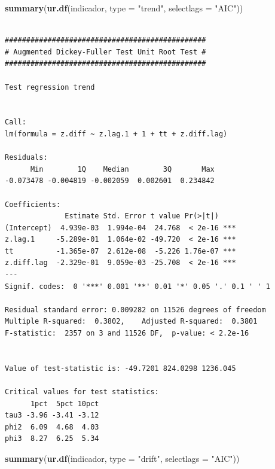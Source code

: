 \documentclass[
  12pt]{article}
\newenvironment{Shaded}{\begin{snugshade}}{\end{snugshade}}
\newcommand{\AttributeTok}[1]{\textcolor[rgb]{0.13,0.29,0.53}{#1}}
\newcommand{\FunctionTok}[1]{\textcolor[rgb]{0.13,0.29,0.53}{\textbf{#1}}}
\newcommand{\NormalTok}[1]{#1}
\newcommand{\StringTok}[1]{\textcolor[rgb]{0.31,0.60,0.02}{#1}}
\begin{document}
\newpage

\begin{Shaded}
\begin{Highlighting}[]
\FunctionTok{summary}\NormalTok{(}\FunctionTok{ur.df}\NormalTok{(indicador, }\AttributeTok{type =}  \StringTok{"trend"}\NormalTok{, }
              \AttributeTok{selectlags =} \StringTok{"AIC"}\NormalTok{))}
\end{Highlighting}
\end{Shaded}

\begin{verbatim}

############################################### 
# Augmented Dickey-Fuller Test Unit Root Test # 
############################################### 

Test regression trend 


Call:
lm(formula = z.diff ~ z.lag.1 + 1 + tt + z.diff.lag)

Residuals:
      Min        1Q    Median        3Q       Max 
-0.073478 -0.004819 -0.002059  0.002601  0.234842 

Coefficients:
              Estimate Std. Error t value Pr(>|t|)    
(Intercept)  4.939e-03  1.994e-04  24.768  < 2e-16 ***
z.lag.1     -5.289e-01  1.064e-02 -49.720  < 2e-16 ***
tt          -1.365e-07  2.612e-08  -5.226 1.76e-07 ***
z.diff.lag  -2.329e-01  9.059e-03 -25.708  < 2e-16 ***
---
Signif. codes:  0 '***' 0.001 '**' 0.01 '*' 0.05 '.' 0.1 ' ' 1

Residual standard error: 0.009282 on 11526 degrees of freedom
Multiple R-squared:  0.3802,    Adjusted R-squared:  0.3801 
F-statistic:  2357 on 3 and 11526 DF,  p-value: < 2.2e-16


Value of test-statistic is: -49.7201 824.0298 1236.045 

Critical values for test statistics: 
      1pct  5pct 10pct
tau3 -3.96 -3.41 -3.12
phi2  6.09  4.68  4.03
phi3  8.27  6.25  5.34
\end{verbatim}

\begin{Shaded}
\begin{Highlighting}[]
\FunctionTok{summary}\NormalTok{(}\FunctionTok{ur.df}\NormalTok{(indicador, }\AttributeTok{type =}  \StringTok{"drift"}\NormalTok{, }
              \AttributeTok{selectlags =} \StringTok{"AIC"}\NormalTok{))}
\end{Highlighting}
\end{Shaded}
\end{document}
